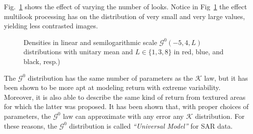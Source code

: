 \documentclass{beamer}
\begin{document}
\begin{frame}
Fig.~\ref{Fig:GI0DistributionLooks} shows the effect of varying the number of looks.
Notice in Fig~\ref{Fig:GI0DistributionLooks} the effect multilook processing has on the distribution of very small and very large values, yielding less contrasted images.
%
%
\begin{figure}[hbt]
\centering
{}
\caption[Densities in linear and semilogarithmic scale $\mathcal G^0(-5,4,L)$ distributions with unitary mean and $L\in\{1,3,8\}$]{Densities in linear and semilogarithmic scale $\mathcal G^0(-5,4,L)$ distributions with unitary mean and $L\in\{1,3,8\}$ in red, blue, and black, resp.)}\label{Fig:GI0DistributionLooks}
\end{figure}
\end{frame}


\begin{frame}
The $\mathcal{G}^0$ distribution has the same number of parameters as the $\mathcal{K}$ law, but it has been shown to be more apt at modeling return with extreme variability.
Moreover, it is also able to describe the same kind of return from textured areas for which the latter was proposed.
It has been shown that, with proper choices of parameters, the $\mathcal G^0$ law can approximate with any error any $\mathcal K$ distribution.
For these reasons, the $\mathcal G^0$ distribution is called \textit{``Universal Model''} for SAR data.
\end{frame}
\end{document}
